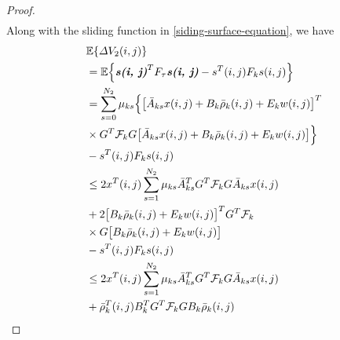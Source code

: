 \documentclass[conference]{IEEEtran}
\begin{document}
\begin{proof}
\begin{equation}
\begin{split}
		\end{split}
	\end{equation}
	Along with the sliding function in \eqref{siding-surface-equation}, we have
	\begin{equation} \label{P2T2}
		\begin{split}
			&\mathbb{E}\{\varDelta V_{2}(i,j) \}\\
			&=\mathbb{E}\Big\{\emph{\textbf{s(i, j)}}^{T}F_{\tau}\emph{\textbf{s(i, j)}} - s^{T}(i,j)F_{k}s(i,j)\Big\}\\
			&=  \sum_{s=0}^{N_{2}}\mu_{ks}\Big\{\big[\bar{A}_{ks}x(i,j)+B_{k}\bar{\rho}_{k}(i,j)+E_{k}w(i,j)\big]^{T}\\
			&\times G^{T}\mathcal{F}_{k} G\big[ \bar{A}_{ks}x(i,j)+B_{k}\bar{\rho}_{k}(i,j)+E_{k}w(i,j)\big]\Big\}\\
			&-s^{T}(i,j)F_{k}s(i,j)\\
			&\leq 2x^{T}(i,j)\sum_{s=1}^{N_{2}}\mu_{ks}\bar{A}^{T}_{ks}G^{T}\mathcal{F}_{k}G\bar{A}_{ks}x(i,j) \\
			&+2\big[B_{k}\bar{\rho}_{k}(i,j)+E_{k}w(i,j)\big]^{T}G^{T}\mathcal{F}_{k}\\
			&\times G\big[B_{k}\bar{\rho}_{k}(i,j)+E_{k}w(i,j)\big]\\
			&-s^{T}(i,j)F_{k}s(i,j)\\
			&\leq 2x^{T}(i,j)\sum_{s=1}^{N_{2}}\mu_{ks}\bar{A}^{T}_{ks}G^{T}\mathcal{F}_{k}G\bar{A}_{ks}x(i,j) \\
			&+ \bar{\rho}^{T}_{k}(i,j)B^{T}_{k}G^{T}\mathcal{F}_{k}GB_{k}\bar{\rho}_{k}(i,j)\\

\end{split}
\end{equation}
\end{proof}
\end{document}
